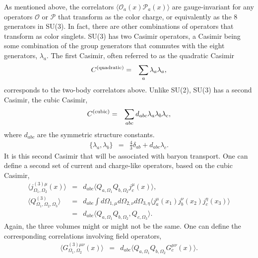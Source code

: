 \documentclass[aps, prc, 12pt, nofootinbib, showpacs, superscriptaddress, tightenlines, groupedaddress]{revtex4-2}
\begin{document}
As mentioned above, the correlators $\langle\mathcal{O}_a(x)\mathcal{P}_a(x)\rangle$ are gauge-invariant for any operators $\mathcal{O}$ or $\mathcal{P}$ that transform as the color charge, or equivalently as the 8 generators in SU(3). In fact, there are other combinations of operators that transform as color singlets. SU(3) has two Casimir operators, a Casimir being some combination of the group generators that commutes with the eight generators, $\lambda_a$. The first Casimir, often referred to as the quadratic Casimir
\begin{eqnarray}
C^{\rm(quadratic)}&=&\sum_a\lambda_a\lambda_a,
\end{eqnarray}
corresponds to the two-body correlators above. Unlike SU(2), SU(3) has a second Casimir, the cubic Casimir,
\begin{eqnarray}
C^{\rm(cubic)}&=&\sum_{abc}d_{abc}\lambda_a\lambda_b\lambda_c,
\end{eqnarray}
where $d_{abc}$ are the symmetric structure constants.
\begin{eqnarray}
\{\lambda_a,\lambda_b\}&=&\frac{4}{3}\delta_{ab}+d_{abc}\lambda_c.
\end{eqnarray}
It is this second Casimir that will be associated with baryon transport. One can define a second set of current and charge-like operators, based on the cubic Casimir,
\begin{eqnarray}
\langle j^{(3)\mu}_{\Omega_1,\Omega_2}(x)\rangle &=&d_{abc}\langle Q_{a,\Omega_1}Q_{b,\Omega_2}j^\mu_c(x)\rangle,\\
\nonumber
\langle Q^{(3)}_{\Omega_1,\Omega_2,\Omega_3}\rangle&=&d_{abc}\int d\Omega_{1,\mu}d\Omega_{2,\nu}d\Omega_{3,\eta}\langle j^\mu_a(x_1) j^\nu_b(x_2)j^\eta_c(x_3)\rangle\\
\nonumber
&=&d_{abc}\langle Q_{a,\Omega_1}Q_{b,\Omega_2},Q_{c,\Omega_3}\rangle.
\end{eqnarray}
Again, the three volumes might or might not be the same. One can define the corresponding correlations involving field operators,
\begin{eqnarray}
\langle G^{(3)\mu\nu}_{\Omega_1,\Omega_2}(x)\rangle&=&d_{abc}\langle Q_{a,\Omega_1}Q_{b,\Omega_2}
G^{\mu\nu}_c(x)\rangle.
\end{eqnarray}
\end{document}
